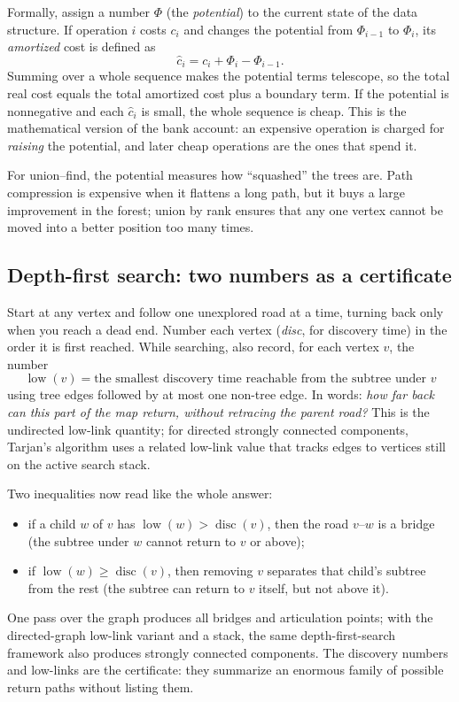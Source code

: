 Formally, assign a number $\Phi$ (the \emph{potential}) to the current state of the data structure. If operation $i$ costs $c_i$ and changes the potential from $\Phi_{i-1}$ to $\Phi_i$, its \emph{amortized} cost is defined as
\[
\widehat c_i=c_i+\Phi_i-\Phi_{i-1}.
\]
Summing over a whole sequence makes the potential terms telescope, so the total real cost equals the total amortized cost plus a boundary term. If the potential is nonnegative and each $\widehat c_i$ is small, the whole sequence is cheap. This is the mathematical version of the bank account: an expensive operation is charged for \emph{raising} the potential, and later cheap operations are the ones that spend it.

For union--find, the potential measures how ``squashed'' the trees are. Path compression is expensive when it flattens a long path, but it buys a large improvement in the forest; union by rank ensures that any one vertex cannot be moved into a better position too many times.

\subsection{Depth-first search: two numbers as a certificate}
Start at any vertex and follow one unexplored road at a time, turning back only when you reach a dead end. Number each vertex (\emph{disc}, for discovery time) in the order it is first reached. While searching, also record, for each vertex $v$, the number
\[
\operatorname{low}(v)=\text{the smallest discovery time reachable from the subtree under }v
\]
using tree edges followed by at most one non-tree edge. In words: \emph{how far back can this part of the map return, without retracing the parent road?} This is the undirected low-link quantity; for directed strongly connected components, Tarjan's algorithm uses a related low-link value that tracks edges to vertices still on the active search stack.

Two inequalities now read like the whole answer:
\begin{itemize}
\item if a child $w$ of $v$ has $\operatorname{low}(w)>\operatorname{disc}(v)$, then the road $v$--$w$ is a bridge (the subtree under $w$ cannot return to $v$ or above);
\item if $\operatorname{low}(w)\geq\operatorname{disc}(v)$, then removing $v$ separates that child's subtree from the rest (the subtree can return to $v$ itself, but not above it).
\end{itemize}
One pass over the graph produces all bridges and articulation points; with the directed-graph low-link variant and a stack, the same depth-first-search framework also produces strongly connected components. The discovery numbers and low-links are the certificate: they summarize an enormous family of possible return paths without listing them.

